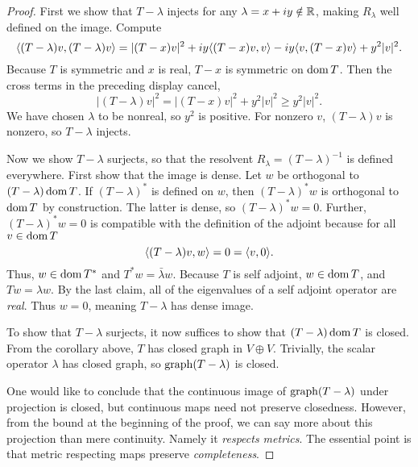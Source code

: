 \documentclass[11pt]{amsart}
\begin{document}
	\begin{proof}
		First we show that $T-\lambda$ injects for any $\lambda=x+iy\notin\mathbb{R}$, making $R_\lambda$ well defined on the image. Compute
			\begin{equation*}
				\langle (T-\lambda)v, (T-\lambda)v \rangle=|(T-x)v|^2+iy\langle (T-x)v, v \rangle-iy\langle v, (T-x)v \rangle+y^2|v|^2.
			\end{equation*}
		Because $T$ is symmetric and $x$ is real, $T-x$ is symmetric on $\operatorname{dom} T$. Then the cross terms in the preceding display cancel,
			\begin{equation}\label{eq:1}	
				|(T-\lambda)v|^2=|(T-x)v|^2+y^2|v|^2 \geq y^2 |v|^2. 
			\end{equation}
		We have chosen $\lambda$ to be nonreal, so $y^2$ is positive. For nonzero $v$, $(T-\lambda)v$ is nonzero, so $T-\lambda$ injects.
		
		Now we show $T-\lambda$ surjects, so that the resolvent $R_\lambda=(T-\lambda)^{-1}$ is defined everywhere. First show that the image is dense. Let $w$ be orthogonal to $(T-\lambda)\operatorname{dom} T$. If $(T-\lambda)^*$ is defined on $w$, then $(T-\lambda)^* w$ is orthogonal to $\operatorname{dom} T$ by construction. The latter is dense, so $(T-\lambda)^*w=0$. Further, $(T-\lambda)^* w=0$ is compatible with the definition of the adjoint because for all $v \in \operatorname{dom} T$
			\begin{equation*}
				\langle (T-\lambda)v, w \rangle=0=\langle v, 0 \rangle.
			\end{equation*}
		Thus, $w \in \operatorname{dom} T^*$ and $T^*w=\bar{\lambda} w$. Because $T$ is self adjoint, $w \in \operatorname{dom} T$, and $Tw=\lambda w$. By the last claim, all of the eigenvalues of a self adjoint operator are \emph{real}. Thus $w=0$, meaning $T-\lambda$ has dense image. 
		
		To show that $T-\lambda$ surjects, it now suffices to show that $(T-\lambda)\operatorname{dom} T$ is closed. From the corollary above, $T$ has closed graph in $V\oplus V$. Trivially, the scalar operator $\lambda$ has closed graph, so $\operatorname{graph}(T-\lambda)$ is closed. 
		
		One would like to conclude that the continuous image of $\operatorname{graph}(T-\lambda)$ under projection is closed, but continuous maps need not preserve closedness. However, from the bound at the beginning of the proof, we can say more about this projection than mere continuity. Namely it \emph{respects metrics}. The essential point is that metric respecting maps preserve \emph{completeness}.
		

\end{proof}
\end{document}
